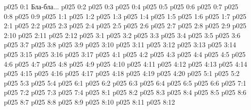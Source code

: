 \author{Высокий Уполномоченный}
\vs p025 0:1  Бла-бла...
\vs p025 0:2 
\vs p025 0:3 
\vs p025 0:4 
\vs p025 0:5 
\vs p025 0:6 
\vs p025 0:7 
\vs p025 0:8 
\vs p025 0:9 \pc 
{}
\vs p025 1:1 
\vs p025 1:2 \pc 
\vs p025 1:3 
\vs p025 1:4 \pc 
\vs p025 1:5 \pc 
\vs p025 1:6 
\vs p025 1:7 
\vs p025 2:1 
\vs p025 2:2 
\vs p025 2:3 
\vs p025 2:4 
\vs p025 2:5 \pc 
\vs p025 2:6 
\vs p025 2:7 
\vs p025 2:8 
\vs p025 2:9 
\vs p025 2:10 \pc 
\vs p025 2:11 \pc 
\vs p025 2:12 
\vs p025 3:1 
\vs p025 3:2 
\vs p025 3:3 
\vs p025 3:4 
\vs p025 3:5 
\vs p025 3:6 
\vs p025 3:7 
\vs p025 3:8 
\vs p025 3:9 
\vs p025 3:10 
\vs p025 3:11 
\vs p025 3:12 
\vs p025 3:13 
\vs p025 3:14 \pc 
\vs p025 3:15 
\vs p025 3:16 
\vs p025 3:17 
\vs p025 4:1 
\vs p025 4:2 \pc 
\vs p025 4:3 
\vs p025 4:4 
\vs p025 4:5 
\vs p025 4:6 
\vs p025 4:7 
\vs p025 4:8 
\vs p025 4:9 
\vs p025 4:10 \pc 
\vs p025 4:11 
\vs p025 4:12 
\vs p025 4:13 
\vs p025 4:14 \pc 
\vs p025 4:15 
\vs p025 4:16 
\vs p025 4:17 \pc 
\vs p025 4:18 
\vs p025 4:19 
\vs p025 4:20 
\vs p025 5:1 
\vs p025 5:2 
\vs p025 5:3 
\vs p025 5:4 
\vs p025 6:1 
\vs p025 6:2 
\vs p025 6:3 
\vs p025 6:4 
\vs p025 6:5 
\vs p025 6:6 
\vs p025 7:1 
\vs p025 7:2 
\vs p025 7:3 
\vs p025 7:4 
\vs p025 8:1 
\vs p025 8:2 
\vs p025 8:3 
\vs p025 8:4 
\vs p025 8:5 \pc 
\vs p025 8:6 
\vs p025 8:7 
\vs p025 8:8 \pc 
\vs p025 8:9 \pc 
\vs p025 8:10 
\vs p025 8:11 
\vsetoff
\vs p025 8:12 
\quizlink
